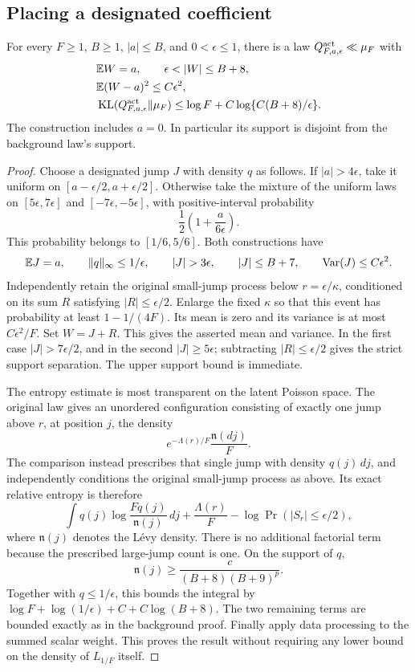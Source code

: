 \subsection{Placing a designated coefficient}
\begin{lemma}
\label{lem:levy-designated}
For every $F\ge1$, $B\ge1$, $|a|\le B$, and $0<\epsilon\le1$, there is a law $Q_{F,a,\epsilon}^{\rm act}\ll\mu_F$ with
\begin{align*}
 &\E W=a,\qquad \epsilon<|W|\le B+8,\\
 &\E(W-a)^2\le C\epsilon^2,\\
 &\KL(Q_{F,a,\epsilon}^{\rm act}\|\mu_F)
       \le\log F+C\log\{C(B+8)/\epsilon\}.
\end{align*}
The construction includes $a=0$. In particular its support is disjoint from the background law's support.
\end{lemma}
\begin{proof}
Choose a designated jump $J$ with density $q$ as follows. If $|a|>4\epsilon$, take it uniform on $[a-\epsilon/2,a+\epsilon/2]$. Otherwise take the mixture of the uniform laws on $[5\epsilon,7\epsilon]$ and $[-7\epsilon,-5\epsilon]$, with positive-interval probability
\[
 \frac12\left(1+\frac a{6\epsilon}\right).
\]
This probability belongs to $[1/6,5/6]$. Both constructions have
\[
 \E J=a,\qquad \|q\|_\infty\le1/\epsilon,
 \qquad |J|>3\epsilon,\qquad |J|\le B+7,
 \qquad \operatorname{Var}(J)\le C\epsilon^2.
\]
Independently retain the original small-jump process below $r=\epsilon/\kappa$, conditioned on its sum $R$ satisfying $|R|\le\epsilon/2$. Enlarge the fixed $\kappa$ so that this event has probability at least $1-1/(4F)$. Its mean is zero and its variance is at most $C\epsilon^2/F$. Set $W=J+R$. This gives the asserted mean and variance. In the first case $|J|>7\epsilon/2$, and in the second $|J|\ge5\epsilon$; subtracting $|R|\le\epsilon/2$ gives the strict support separation. The upper support bound is immediate.

The entropy estimate is most transparent on the latent Poisson space. The original law gives an unordered configuration consisting of exactly one jump above $r$, at position $j$, the density
\[
 e^{-\Lambda(r)/F}\frac{\mathfrak n(dj)}F.
\]
The comparison instead prescribes that single jump with density $q(j)\,dj$, and independently conditions the original small-jump process as above. Its exact relative entropy is therefore
\begin{equation}
 \int q(j)\log\frac{Fq(j)}{\mathfrak n(j)}\,dj
       +\frac{\Lambda(r)}F
       -\log\Pr(|S_r|\le\epsilon/2),
 \label{eq:levy-latent-active-entropy}
\end{equation}
where $\mathfrak n(j)$ denotes the L\'evy density. There is no additional factorial term because the prescribed large-jump count is one. On the support of $q$,
\[
 \mathfrak n(j)\ge\frac c{(B+8)(B+9)^p}.
\]
Together with $q\le1/\epsilon$, this bounds the integral by
$\log F+\log(1/\epsilon)+C+C\log(B+8)$.
The two remaining terms are bounded exactly as in the background proof. Finally apply data processing to the summed scalar weight. This proves the result without requiring any lower bound on the density of $L_{1/F}$ itself.
\end{proof}
